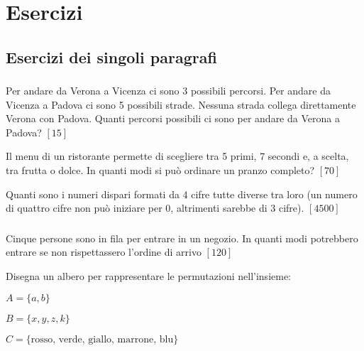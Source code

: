 
\section{Esercizi}

\subsection{Esercizi dei singoli paragrafi}

\subsubsection*{}

\begin{esercizio}
\label{ese:I.1}
Per andare da Verona a Vicenza ci sono 3 possibili percorsi. Per andare da Vicenza a Padova ci sono 5 possibili strade. Nessuna strada collega direttamente Verona con Padova. Quanti percorsi possibili ci sono per andare da Verona a Padova?
\hfill $\left[15\right]$
\end{esercizio}

\begin{esercizio}
\label{ese:I.2}
Il menu di un ristorante permette di scegliere tra 5 primi, 7 secondi e, a scelta, tra frutta o dolce. In quanti modi si può ordinare un pranzo completo?
\hfill $\left[70\right]$
\end{esercizio}

\begin{esercizio}\label{ese:I.3}
Quanti sono i numeri dispari formati da 4 cifre tutte diverse tra loro (un numero di quattro cifre non può iniziare per 0, altrimenti sarebbe di 3 cifre).
\hfill $\left[4500\right]$
\end{esercizio}


\subsubsection*{}
\begin{esercizio}
\label{ese:P.1}
Cinque persone sono in fila per entrare in un negozio. In quanti modi potrebbero entrare se non rispettassero l'ordine di arrivo
\hfill $\left[120\right]$
\end{esercizio}

\begin{esercizio}\label{ese:P.2}
Disegna un albero per rappresentare le permutazioni nell'insieme:
 \begin{enumeratea}
  \item $A=\{ a,b\}$
  \item $B=\{ x,y,z,k\}$
  \item $C=\{\text{rosso, verde, giallo, marrone, blu}\}$
 \end{enumeratea}
\end{esercizio}

